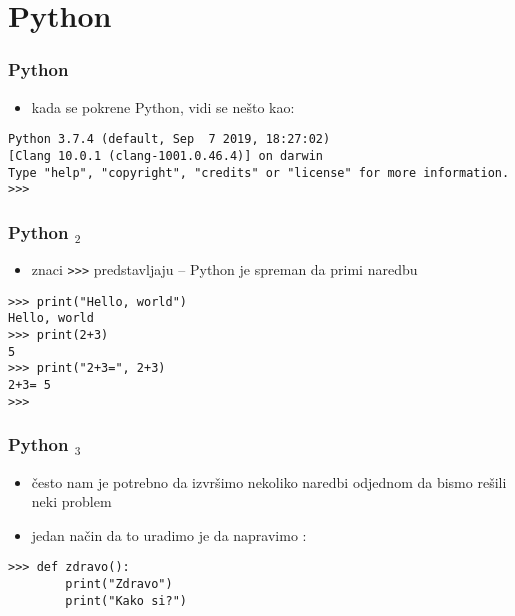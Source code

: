 \documentclass[utf8,compress,aspectratio=169]{beamer}
\begin{document}

\section{Python}

\begin{frame}[fragile,shrink=15]
\frametitle{Python}
\begin{itemize}
  \item kada se pokrene Python, vidi se nešto kao:
\end{itemize}
\begin{verbatim}
Python 3.7.4 (default, Sep  7 2019, 18:27:02)
[Clang 10.0.1 (clang-1001.0.46.4)] on darwin
Type "help", "copyright", "credits" or "license" for more information.
>>>
\end{verbatim}
\end{frame}


\begin{frame}[fragile]
\frametitle{Python $_2$}
\begin{itemize}
  \item znaci \texttt{>}\texttt{>}\texttt{>} predstavljaju  -- Python je spreman da primi naredbu
\end{itemize}
\begin{verbatim}
>>> print("Hello, world")
Hello, world
>>> print(2+3)
5
>>> print("2+3=", 2+3)
2+3= 5
>>>
\end{verbatim}
\end{frame}

\begin{frame}[fragile]
\frametitle{Python $_3$}
\begin{itemize}
  \item često nam je potrebno da izvršimo nekoliko naredbi odjednom da bismo rešili neki problem
  \item jedan način da to uradimo je da napravimo :
\end{itemize}
\begin{verbatim}
>>> def zdravo():
        print("Zdravo")
        print("Kako si?")
\end{verbatim}
\end{frame}
\end{document}
